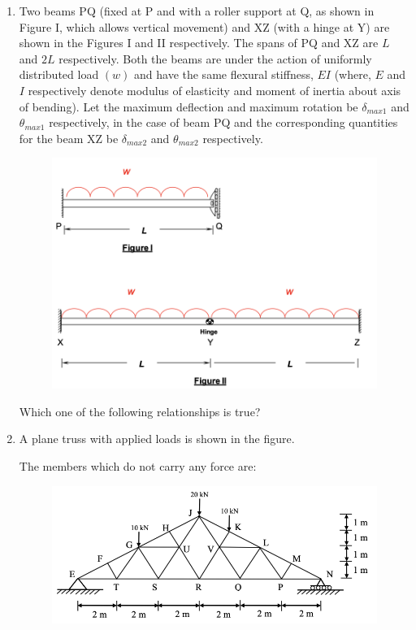 \documentclass[journal]{IEEEtran}
\begin{document}
\begin{enumerate}[resume]
\item Two beams PQ (fixed at P and with a roller support at Q, as shown in Figure I, which allows vertical movement) and XZ (with a hinge at Y) are shown in the Figures I and II respectively. The spans of PQ and XZ are $L$ and $2L$ respectively. Both the beams are under the action of uniformly distributed load $(w)$ and have the same flexural stiffness, $EI$ (where, $E$ and $I$ respectively denote modulus of elasticity and moment of inertia about axis of bending). Let the maximum deflection and maximum rotation be $\delta_{max1}$ and $\theta_{max1}$ respectively, in the case of beam PQ and the corresponding quantities for the beam XZ be $\delta_{max2}$ and $\theta_{max2}$ respectively. \hfill {}

\begin{figure}[H]
    \centering
    \includegraphics[width=0.3\columnwidth]{figs/Q42.png} 
    \caption{}
    \label{fig:placeholder}
\end{figure}

Which one of the following relationships is true?
\begin{enumerate}
\end{enumerate}

\item A plane truss with applied loads is shown in the figure. \hfill {}

The members which do not carry any force are:

\begin{figure}[H]
    \centering
    \includegraphics[width=0.3\columnwidth]{figs/Q43.png} 
    \caption{}
    \label{fig:placeholder}
\end{figure}


\end{enumerate}
\end{document}
